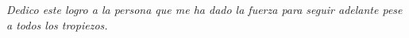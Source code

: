 \begin{dedication}
	\textit{Dedico este logro a la persona que me ha dado la fuerza para seguir adelante pese a todos los tropiezos.}
\end{dedication}